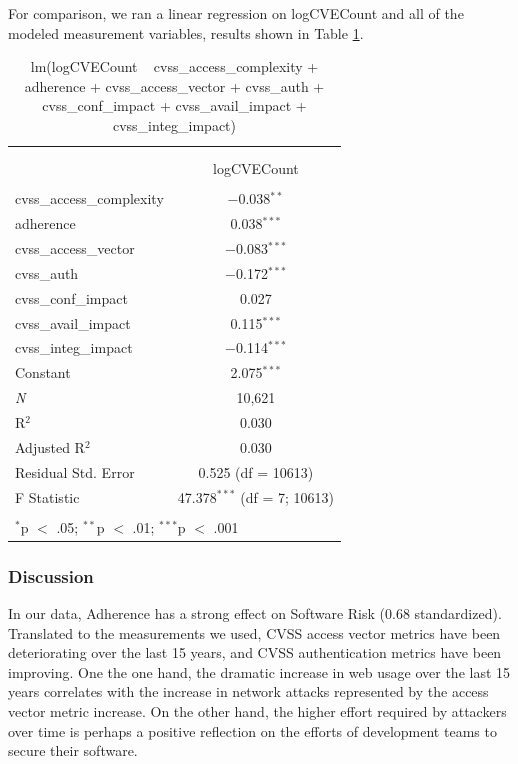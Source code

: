 For comparison, we ran a linear regression on logCVECount and all of the modeled measurement variables, results shown in Table \ref{tab:nvd_initial_regression}.

\begin{table}[!htbp] \centering 
	\caption{lm(logCVECount ~ cvss\_access\_complexity + adherence + cvss\_access\_vector + cvss\_auth + cvss\_conf\_impact + cvss\_avail\_impact + cvss\_integ\_impact)} 
	\label{tab:nvd_initial_regression} 
	\begin{tabular}{@{\extracolsep{5pt}}lc} 
		\\[-1.8ex]\hline \\[-1.8ex] 
		\\[-1.8ex] & logCVECount \\ 
		\hline \\[-1.8ex] 
		cvss\_access\_complexity & $-$0.038$^{**}$ \\ 
		adherence & 0.038$^{***}$ \\ 
		cvss\_access\_vector & $-$0.083$^{***}$ \\ 
		cvss\_auth & $-$0.172$^{***}$ \\ 
		cvss\_conf\_impact & 0.027 \\ 
		cvss\_avail\_impact & 0.115$^{***}$ \\ 
		cvss\_integ\_impact & $-$0.114$^{***}$ \\ 
		Constant & 2.075$^{***}$ \\ 
		\textit{N} & 10,621 \\ 
		R$^{2}$ & 0.030 \\ 
		Adjusted R$^{2}$ & 0.030 \\ 
		Residual Std. Error & 0.525 (df = 10613) \\ 
		F Statistic & 47.378$^{***}$ (df = 7; 10613) \\ 
		\hline \\[-1.8ex] 
		\multicolumn{2}{l}{$^{*}$p $<$ .05; $^{**}$p $<$ .01; $^{***}$p $<$ .001} \\ 
	\end{tabular} 
\end{table}

\subsubsection{Discussion}
\label{sec:case_nvd_discussion}
In our data, Adherence has a strong effect on Software Risk (0.68 standardized). Translated to the measurements we used, CVSS access vector metrics have been deteriorating over the last 15 years, and CVSS authentication metrics have been improving. One the one hand, the dramatic increase in web usage over the last 15 years correlates with the increase in network attacks represented by the access vector metric increase. On the other hand, the higher effort required by attackers over time is perhaps a positive reflection on the efforts of development teams to secure their software.  
 
